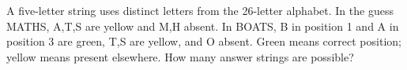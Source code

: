 A five-letter string uses distinct letters from the 26-letter alphabet. In the guess MATHS, A,T,S are yellow and M,H absent. In BOATS, B in position 1 and A in position 3 are green, T,S are yellow, and O absent. Green means correct position; yellow means present elsewhere. How many answer strings are possible?

